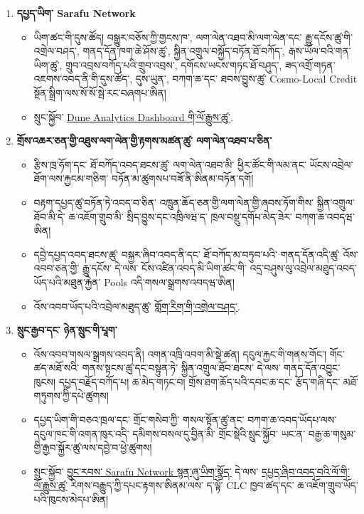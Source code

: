 \documentclass[11pt]{article}
\begin{document}
\begin{enumerate}[leftmargin=*]
\item \textbf{དཔྱད་ཡིག་ Sarafu Network}
\begin{itemize}[leftmargin=*]
\item ཡིག་ཚང་གི་དུས་ཚོད། བསྒྱུར་བཅོས་ཀྱི་གྱངས་ཁ་, ལག་ལེན་འཐབ་མི་ལག་ལེན་དང་ རྒྱུ་དངོས་ཚུ་གི་འགྲེལ་བཤད་, གནད་དོན་ཁག་ཆེ་ཤོས་ཚུ་, སྐྱིན་འགྲུལ་བསྐྱོད་བཏོན་ཐོ་བཀོད་, རྒས་ཡོལ་བའི་གན་ཡིག་ཚུ་, གྲུབ་འབྲས་བཀོད་པའི་གྲུབ་འབྲས་, དགོངས་ཡངས་གཏང་ཐོ་བཤུད་, ཟད་འགྲོ་གཏན་འཇགས་འབད་ནི་གི་དུས་ཚོད་, དུས་ཡུན་, བཀག་ཆ་དང་ ཐབས་བྱུས་ཚུ་ Cosmo-Local Credit སྔོན་སྒྲིག་ལས་སོ་སོ་སྦེ་རང་བཞགཔ་ཨིན།
\item སྲུང་སྐྱོབ་ \href{https://dune.com/grassrootseconomics/sarafu-network}{Dune Analytics Dashboard གི་ལོ་རྒྱུས་ཚུ་}.
\end{itemize}
\item \textbf{གྲོས་འཆར་ཅན་གྱི་འཐུས་ལག་ལེན་གྱི་རྟགས་མཚན་ཚུ་ ལག་ལེན་འཐབ་པ་ཅིན་}
\begin{itemize}[leftmargin=*]
\item རྩིས་ཁྲ་ཧོག་དང་ ཐོ་བཀོད་འབད་ཐངས་ཚུ་ ལག་ལེན་འཐབ་མི་ ཕྱིར་ཚོང་གི་ལམ་ནང་ ཡོངས་འབྲེལ་ཐོག་ལས་རྐྱངམ་གཅིག་ བཏོན་མ་ཚུགསཔ་བཟོ་ནི་ཨིནམ་བཏོན་དགོ།
\item བརྟག་དཔྱད་ཚུ་བཏོན་ཏེ་འབད་བ་ཅིན་ འཁྲུན་ཆོད་ཅན་གྱི་ལག་ལེན་གྱི་ཞབས་ཏོག་གིས་ སྐྱིན་འགྲུལ་ཐོབ་མི་དེ་ ཆ་འཇོག་གྲུབ་མི་ སྲིད་བྱུས་དང་འཁྲིལཝ་ད་ ཁྲལ་བསྡུ་དགོཔ་མེད་ཟེར་ བཀག་ཆ་འབདཝ་ཨིན།
\item དབྱེ་དཔྱད་འབད་ཐངས་ཚུ་ བསྐྱར་ཞིབ་འབད་ནི་དང་ ཐོ་བཀོད་མ་བཏུབ་པའི་ གནད་དོན་འདི་ཚུ་ འོས་འབབ་ཅན་གྱི་ རྒྱུ་དངོས་ དེ་ལས་ ངོས་འཛིན་འབད་མི་ཡིག་ཚང་གི་ འདྲ་བཤུས་ལུ་འབྲེལ་མཐུད་འབད་ཡོད་པའི་མཐུན་རྐྱེན་ Pools འདི་གསལ་སྒྲགས་འབདཝ་ཨིན།
\item འོས་འབབ་ཡོད་པའི་འབྲེལ་མཐུད་ཚུ་ \href{https://software.grassecon.org}{གློག་རིག་གི་འགྲེལ་བཤད་}.
\end{itemize}
\item \textbf{སྲུང་རྒྱབ་དང་ ཉེན་སྲུང་གི་པཱག་}
\begin{itemize}[leftmargin=*]
\item འོས་འབབ་གསལ་སྒྲགས་འབད་ནི། འགན་འཁྲི་འབག་མི་སྡེ་ཚན། དངུལ་རྐྱང་གི་གནས་གོང་། གོང་ཚད་མཐོ་སའི་ གནས་སྟངས་ཚུ་དང་བསྟུན་ཏེ་ སྐྱིན་འགྲུལ་ཐོབ་ཐངས་ དེ་ལས་ གནད་དོན་འབྱུང་ཁུངས། དཔྱད་བརྗོད་བཀོད་པ། ཆ་མེད་གཏང་བ། གྲོས་ཐག་ཆོད་པའི་དབང་ཆ་དང་ རྩོད་གཞི་དང་ མཐོ་གཏུགས་ཀྱི་དཔེ་ཚུགས།
\item དཔྱད་ཡིག་གི་བཅའ་ཁྲལ་དང་ གྲོང་གསེབ་ཀྱི་ གསལ་སྟོན་ཚུ་ནང་ བཀག་ཆ་འབད་ཡོདཔ་ལས་ དངུལ་ཁང་གི་འགན་ཁུར་འདི་ དམིགས་བསལ་དུ་བྱིན་མི་ གྲོང་སྡེའི་སྲུང་སྐྱོབ་ ཡང་ན་ བརྒྱ་ཆ་གསུམ་གྱི་རྒྱབ་སྐྱོར་ཚུ་ལས་དབྱེ་བ་ཕྱེ་ཚུགས།
\item སྲུང་སྐྱོབ་ \href{https://sarafu.network/reports}{བྱུང་རབས་ Sarafu Network སྙན་ཞུ་ཡིག་སྣོད་} དེ་ལས་ \href{https://youtu.be/5yGaP31bvs0?si=fZ-AMTEXsmVR8Ulv}{དཔྱད་ཞིབ་འབད་བའི་ལོ་གི་ལོ་རྒྱུས་ཚུ་} རིགས་བརྒྱུད་ཀྱི་དཔང་རྟགས་ཨིནམ་ལས་ ད་ལྟོ་ CLC ཁྱབ་ཚད་དང་ ཆ་འཇོག་གྲུབ་ཡོད་པའི་ཁུངས་མེདཔ་ཨིན།

\end{itemize}
\end{enumerate}
\end{document}
